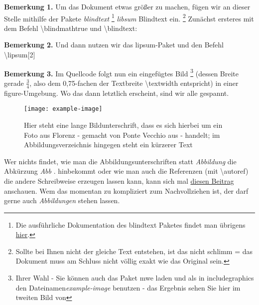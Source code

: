 \documentclass{scrartcl}
\begin{document}
\textbf{Bemerkung 1.} Um das Dokument etwas größer zu machen, f\"ugen wir an dieser Stelle mithilfe
der Pakete \textit{blindtext} \footnote{Die ausf\"uhrliche Dokumentation des blindtext Paketes findet man \"ubrigens
\href{http://tug.ctan.org/tex-archive/macros/latex/contrib/blindtext/blindtext.pdf}{hier}.} \textit{libsum} Blindtext ein.
\footnote{Sollte bei Ihnen nicht der gleiche Text entstehen, ist das nicht schlimm = das Dokument muss am Schluss nicht v\"ollig exakt wie das Original sein.}
Zun\"achst ersteres mit dem Befehl \textbackslash{}blindmathtrue und
\textbackslash{}blindtext:\newline

\blindmathtrue
\blindtext
\newline

\textbf{Bemerkung 2.} Und dann nutzen wir das lipsum-Paket und den Befehl \textbackslash lipsum[2]
\newpage

\lipsum[2]
\newline

\noindent \textbf{Bemerkung 3.} Im Quellcode folgt nun ein eingef\"ugtes Bild
\footnote{Ihrer Wahl - Sie k\"onnen auch das Paket mwe
laden und als in includegraphics den \glqq Dateinamen\grqq \textit{example-image} benutzen - das Ergebnis sehen Sie hier im
tweiten Bild von }%
(dessen Breite gerade $\frac{3}{4}$, also dem 0,75-fachen der Textbreite \textbackslash textwidth entspricht) in einer figure-Umgebung. Wo das dann letztlich erscheint, sind wir alle gespannt.

 
\begin{figure}[h]
 \begin{center}
  \texttt{[image: example-image]}
 \end{center}
  \caption[Ein Bild aus Florenz]{Hier steht eine lange Bildunterschrift, dass es sich hierbei um ein Foto aus Florenz - gemacht von Ponte Vecchio aus - handelt; im Abbildungsverzeichnis hingegen steht ein k\"urzerer Text}
  \label{abb1}
\end{figure}

Wer nichts findet, wie man die Abbildungsunterschriften statt \textit{Abbildung} die Ab\-k\"urzung \textit{Abb} .
hinbekommt oder wie man auch die Referenzen (mit \textbackslash autoref) die andere Schreibweise erzeugen lassen kann,
kann sich mal \href{https://texwelt.de/wissen/fragen/991/wie-kann-ich-die-von-autoref-verwendete-bezeichnung-fur-abbildungen-andern}{diesen Beitrag} anschauen. Wem das momentan zu kompliziert zum Nachvollziehen ist, der darf gerne auch \textit{Abbildungen} stehen lassen.
\newline
\end{document}
